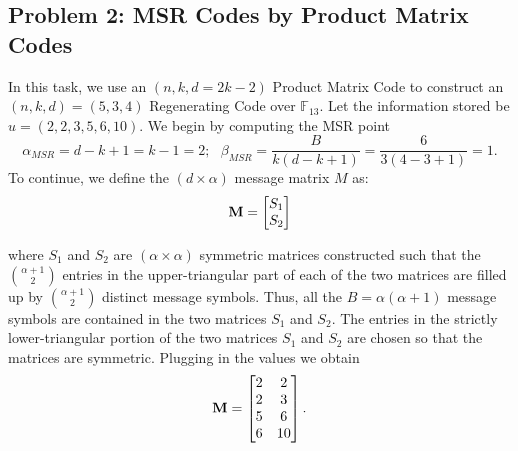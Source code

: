 \documentclass{article}
\begin{document}
\subsection*{Problem 2: MSR Codes by Product Matrix Codes}
In this task, we use an $(n,k,d=2k-2)$ Product Matrix Code to construct an $(n, k, d) = (5, 3, 4)$ Regenerating Code over $\mathbb{F}_{13}$. Let the information stored be $u = (2, 2, 3, 5, 6, 10)$. 
We begin by computing the MSR point
\begin{equation*}
\alpha_{MSR} = d - k +1 = k-1 = 2; \text{ }
\beta_{MSR}=\dfrac{B}{k(d-k+1)}=\dfrac{6}{3(4-3+1)}=1.
\end{equation*}
To continue, we define the $(d \times \alpha)$ message matrix $M$ as:
\begin{equation*}
\vb{M} = \begin{bmatrix} S_1\\ S_2 \end{bmatrix}
\end{equation*} 

where $S_1$ and $S_2$ are $(\alpha \times \alpha)$ symmetric matrices constructed such that the ${\alpha + 1}\choose{2}$ entries in the upper-triangular part of each of the two matrices are filled up by ${\alpha + 1}\choose{2}$ distinct message symbols. Thus, all the $B=\alpha(\alpha+1)$ message symbols are contained in the two matrices $S_1$ and $S_2$. The entries in the strictly lower-triangular portion of the two matrices $S_1$ and $S_2$ are chosen so that the matrices are symmetric. Plugging in the values we obtain
\begin{equation*}
\vb{M} =
\begin{bmatrix}
2 & 2 \\
2 & 3 \\
5 & 6 \\
6 & 10 \\
\end{bmatrix}.
\end{equation*}
\end{document}

